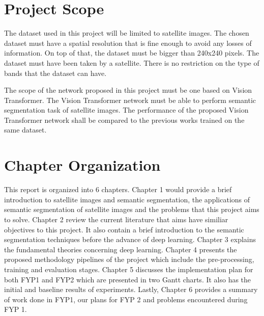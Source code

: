 \section{Project Scope}

The dataset used in this project will be limited to satellite images. The chosen dataset must have a spatial resolution that is fine enough to avoid any losses of information. On top of that, the dataset must be bigger than 240x240 pixels. The dataset must have been taken by a satellite. There is no restriction on the type of bands that the dataset can have.

The scope of the network proposed in this project must be one based on Vision Transformer.  The Vision Transformer network must be able to perform semantic segmentation task of satellite images. The performance of the proposed Vision Transformer network shall be compared to the  previous works trained on the same dataset.

\section{Chapter Organization}

This report is organized into 6 chapters. Chapter 1 would provide a brief introduction to satellite images and semantic segmentation, the applications of semantic segmentation of satellite images and the problems that this project aims to solve. Chapter 2 review the current literature that aims have similiar objectives to this project. It also contain a brief introduction to the semantic segmentation techniques before the advance of deep learning. Chapter 3 explains the fundamental theories concerning deep learning. Chapter 4 presents the proposed methodology pipelines of the project which include the pre-processing, training and evaluation stages. Chapter 5 discusses the implementation plan for both FYP1 and FYP2 which are presented in two Gantt charts. It also has the initial and baseline results of experiments. Lastly, Chapter 6 provides a summary of work
done in FYP1, our plans for FYP 2 and problems encountered during FYP 1.
